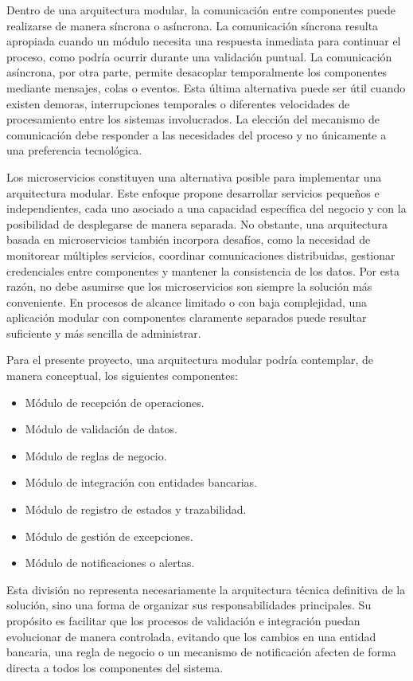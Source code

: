 Dentro de una arquitectura modular, la comunicación entre componentes puede realizarse de manera síncrona o asíncrona. La comunicación síncrona resulta apropiada cuando un módulo necesita una respuesta inmediata para continuar el proceso, como podría ocurrir durante una validación puntual. La comunicación asíncrona, por otra parte, permite desacoplar temporalmente los componentes mediante mensajes, colas o eventos. Esta última alternativa puede ser útil cuando existen demoras, interrupciones temporales o diferentes velocidades de procesamiento entre los sistemas involucrados. La elección del mecanismo de comunicación debe responder a las necesidades del proceso y no únicamente a una preferencia tecnológica.

Los microservicios constituyen una alternativa posible para implementar una arquitectura modular. Este enfoque propone desarrollar servicios pequeños e independientes, cada uno asociado a una capacidad específica del negocio y con la posibilidad de desplegarse de manera separada. No obstante, una arquitectura basada en microservicios también incorpora desafíos, como la necesidad de monitorear múltiples servicios, coordinar comunicaciones distribuidas, gestionar credenciales entre componentes y mantener la consistencia de los datos. Por esta razón, no debe asumirse que los microservicios son siempre la solución más conveniente. En procesos de alcance limitado o con baja complejidad, una aplicación modular con componentes claramente separados puede resultar suficiente y más sencilla de administrar.

Para el presente proyecto, una arquitectura modular podría contemplar, de manera conceptual, los siguientes componentes:

\begin{itemize}
\item Módulo de recepción de operaciones.
\item Módulo de validación de datos.
\item Módulo de reglas de negocio.
\item Módulo de integración con entidades bancarias.
\item Módulo de registro de estados y trazabilidad.
\item Módulo de gestión de excepciones.
\item Módulo de notificaciones o alertas.
\end{itemize}
Esta división no representa necesariamente la arquitectura técnica definitiva de la solución, sino una forma de organizar sus responsabilidades principales. Su propósito es facilitar que los procesos de validación e integración puedan evolucionar de manera controlada, evitando que los cambios en una entidad bancaria, una regla de negocio o un mecanismo de notificación afecten de forma directa a todos los componentes del sistema.


